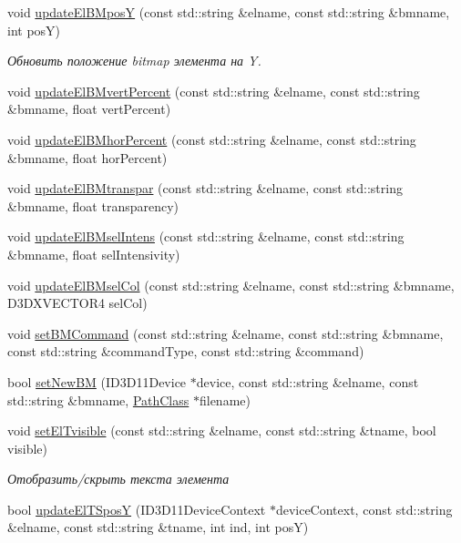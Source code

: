 \begin{DoxyCompactItemize}
void \hyperlink{class_interface_class_a210bf2338bb32ea0fe5a3e346bd60720}{update\+El\+B\+MposY} (const std\+::string \&elname, const std\+::string \&bmname, int posY)
\begin{DoxyCompactList}\small\item\em Обновить положение bitmap элемента на Y. \end{DoxyCompactList}\item 
void \hyperlink{class_interface_class_a879368af776887aaf423370d163f1e26}{update\+El\+B\+Mvert\+Percent} (const std\+::string \&elname, const std\+::string \&bmname, float vert\+Percent)
\item 
void \hyperlink{class_interface_class_a58646260e6f9fc97d009be4ed5a8e83b}{update\+El\+B\+Mhor\+Percent} (const std\+::string \&elname, const std\+::string \&bmname, float hor\+Percent)
\item 
void \hyperlink{class_interface_class_ac029c16a7e77fdf44f4ee1eb8322b94f}{update\+El\+B\+Mtranspar} (const std\+::string \&elname, const std\+::string \&bmname, float transparency)
\item 
void \hyperlink{class_interface_class_a1c253f8a2aaf951a88060374f6f1af41}{update\+El\+B\+Msel\+Intens} (const std\+::string \&elname, const std\+::string \&bmname, float sel\+Intensivity)
\item 
void \hyperlink{class_interface_class_ae0d925b28780bb6874c430389d4e9983}{update\+El\+B\+Msel\+Col} (const std\+::string \&elname, const std\+::string \&bmname, D3\+D\+X\+V\+E\+C\+T\+O\+R4 sel\+Col)
\item 
void \hyperlink{class_interface_class_a34cb91552c18be468d736d79f5d4d34b}{set\+B\+M\+Command} (const std\+::string \&elname, const std\+::string \&bmname, const std\+::string \&command\+Type, const std\+::string \&command)
\item 
bool \hyperlink{class_interface_class_ae9ae8928416db90b31c87f31784d6972}{set\+New\+BM} (I\+D3\+D11\+Device $\ast$device, const std\+::string \&elname, const std\+::string \&bmname, \hyperlink{class_path_class}{Path\+Class} $\ast$filename)
\item 
void \hyperlink{class_interface_class_aa25dbe2382a057aff8dcfd7bf74ff3fd}{set\+El\+Tvisible} (const std\+::string \&elname, const std\+::string \&tname, bool visible)
\begin{DoxyCompactList}\small\item\em Отобразить/скрыть текста элемента \end{DoxyCompactList}\item 
bool \hyperlink{class_interface_class_a54b5ea1f2329afaa599dbdc1d28d516e}{update\+El\+T\+SposY} (I\+D3\+D11\+Device\+Context $\ast$device\+Context, const std\+::string \&elname, const std\+::string \&tname, int ind, int posY)

\end{DoxyCompactItemize}
